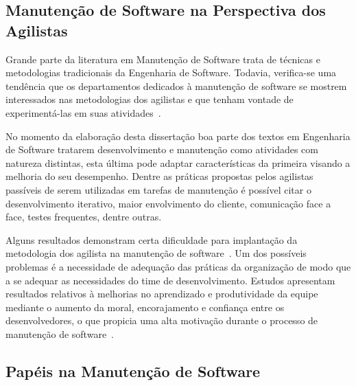 \subsection{Manutenção de Software na Perspectiva dos Agilistas}
\label{sub:manutenção_de_software_com_método_dos_agilistas}

Grande parte da literatura em Manutenção de Software trata de técnicas e
metodologias tradicionais da Engenharia de Software. Todavia, verifica-se uma
tendência que os departamentos dedicados à manutenção de software se mostrem
interessados nas metodologias dos agilistas e que tenham vontade de
experimentá-las em suas atividades~\cite{Heeager2015}.

No momento da elaboração desta dissertação boa parte dos textos em Engenharia de
Software tratarem desenvolvimento e manutenção como atividades com natureza
distintas, esta última pode adaptar características da primeira visando a
melhoria do seu desempenho. Dentre as práticas propostas pelos agilistas
passíveis de serem utilizadas em tarefas de manutenção é possível citar o
desenvolvimento iterativo, maior envolvimento do cliente, comunicação face a
face, testes frequentes, dentre outras.

Alguns resultados demonstram certa dificuldade para implantação da metodologia
dos agilista na manutenção de software~\cite{1402140}. Um dos possíveis
problemas é a necessidade de adequação das práticas da organização de modo que a
se adequar as necessidades do time de desenvolvimento.  Estudos apresentam
resultados relativos à melhorias no aprendizado e produtividade da equipe
mediante o aumento da moral, encorajamento e confiança entre os desenvolvedores,
o que propicia uma alta motivação durante o processo de manutenção de
software~\cite{Choudhari:2014:EIM:2557833.2557845}.


\subsection{Papéis na Manutenção de Software}
\label{subsec:man_visao_geral_papeis_na_manutencao_de_software}

